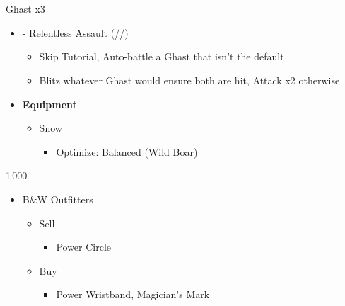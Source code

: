 \chapter[Chapter 3]{}

\renewcommand{\first}{[1] - Relentless Assault (\com/\rav/\rav)}
\begin{multicols}{2}

\begin{battle}{Ghast x3}
\begin{itemize}
    \item \first
    \begin{itemize}
        \item Skip Tutorial, Auto-battle a Ghast that isn't the default
        \item Blitz whatever Ghast would ensure both are hit, Attack x2 otherwise
    \end{itemize}
\end{itemize}
\end{battle}
\begin{menu}
\begin{itemize}
    \item \textbf{Equipment}
    \begin{itemize}
        \item Snow
        \begin{itemize}
            \item Optimize: Balanced (Wild Boar)
        \end{itemize}
    \end{itemize}
\end{itemize}
\end{menu}
\begin{shop}{1\,000}
\begin{itemize}
    \item B\&W Outfitters
    \begin{itemize}
        \item Sell
        \begin{itemize}
            \item Power Circle
        \end{itemize}
        \item Buy
        \begin{itemize}
            \item Power Wristband, Magician's Mark
        \end{itemize}
    \end{itemize}
\end{itemize}

\end{shop}
\end{multicols}
